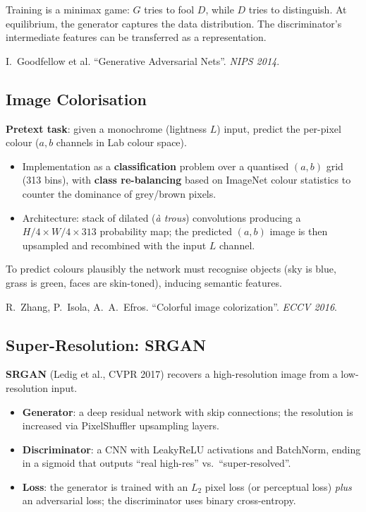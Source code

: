 \documentclass[11pt,a4paper]{article}
\theoremstyle{definition}
\theoremstyle{plain}
\theoremstyle{remark}
\begin{document}
Training is a minimax game: $G$ tries to fool $D$, while $D$ tries to distinguish. At equilibrium, the generator captures the data distribution. The discriminator's intermediate features can be transferred as a representation.

\begin{tcolorbox}[colback=blue!5!white,colframe=blue!60!black,title={Reference}]
I.\ Goodfellow et al. ``Generative Adversarial Nets''. \textit{NIPS 2014}.
\end{tcolorbox}

\subsection{Image Colorisation}

\textbf{Pretext task}: given a monochrome (lightness $L$) input, predict the per-pixel colour ($a,b$ channels in Lab colour space).

\begin{itemize}
    \item Implementation as a \textbf{classification} problem over a quantised $(a,b)$ grid (313 bins), with \textbf{class re-balancing} based on ImageNet colour statistics to counter the dominance of grey/brown pixels.
    \item Architecture: stack of dilated (\emph{à trous}) convolutions producing a $H/4 \times W/4 \times 313$ probability map; the predicted $(a,b)$ image is then upsampled and recombined with the input $L$ channel.
\end{itemize}

To predict colours plausibly the network must recognise objects (sky is blue, grass is green, faces are skin-toned), inducing semantic features.

\begin{tcolorbox}[colback=blue!5!white,colframe=blue!60!black,title={Reference}]
R.\ Zhang, P.\ Isola, A.\ A.\ Efros. ``Colorful image colorization''. \textit{ECCV 2016}.
\end{tcolorbox}

\subsection{Super-Resolution: SRGAN}

\textbf{SRGAN} (Ledig et al., CVPR 2017) recovers a high-resolution image from a low-resolution input.

\begin{itemize}
    \item \textbf{Generator}: a deep residual network with skip connections; the resolution is increased via PixelShuffler upsampling layers.
    \item \textbf{Discriminator}: a CNN with LeakyReLU activations and BatchNorm, ending in a sigmoid that outputs ``real high-res'' vs.\ ``super-resolved''.
    \item \textbf{Loss}: the generator is trained with an $L_2$ pixel loss (or perceptual loss) \emph{plus} an adversarial loss; the discriminator uses binary cross-entropy.
\end{itemize}
\end{document}
